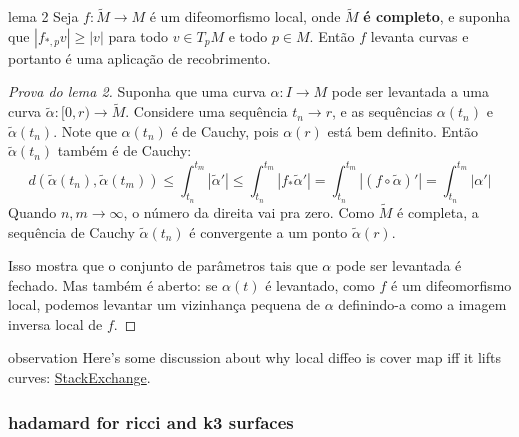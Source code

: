 \begin{thing7}{lema 2}\leavevmode
Seja \(f:\tilde{M} \to M\) é um difeomorfismo local, onde \(\tilde{M}\) \textbf{é completo}, e suponha que \(|f_{*,p} v|\geq |v|\) para todo \(v \in T_pM\) e todo \(p \in M\). Então \(f\) levanta curvas e portanto é uma aplicação de recobrimento.
\end{thing7}
\begin{proof}[Prova do lema 2]\leavevmode
Suponha que uma curva \(\alpha:I \to M\) pode ser levantada a uma curva \(\tilde{\alpha}:[0,r) \to \tilde{M}\). Considere uma sequência \(t_n \to r\), e as sequências \(\alpha(t_n)\) e \(\tilde{\alpha}(t_n)\). Note que \(\alpha(t_n)\) é de Cauchy, pois \(\alpha(r)\) está bem definito. Então \(\tilde{\alpha}(t_n)\) também é de Cauchy:
\[d(\tilde{\alpha}(t_n),\tilde{\alpha}(t_m))\leq \int_{t_n}^{t_m} |\tilde{\alpha}'|\leq \int_{t_n}^{t_m}|f_*\tilde{\alpha}'|=\int_{t_n}^{t_m}|(f \circ\tilde{\alpha})'|=\int_{t_n}^{t_m}|\alpha'|\]
Quando \(n,m \to \infty\), o número da direita vai pra zero. Como \(\tilde{M}\) é completa, a sequência de Cauchy \(\tilde{\alpha}(t_n)\) é convergente a um ponto \(\tilde{\alpha}(r)\).

Isso mostra que o conjunto de parâmetros tais que \(\alpha\) pode ser levantada é fechado. Mas também é aberto: se \(\alpha(t)\) é levantado, como \(f\) é um difeomorfismo local, podemos levantar um vizinhança pequena de \(\alpha\) definindo-a como a imagem inversa local de \(f\).
\end{proof}

\begin{thing7}{observation}\leavevmode
Here's some discussion about why local diffeo is cover map iff it lifts curves: \href{https://math.stackexchange.com/questions/3122251/local-homeomorphism-curve-lifting-property-gives-a-covering-map}{StackExchange}.
\end{thing7}

\subsubsection*{hadamard for ricci and k3 surfaces}

